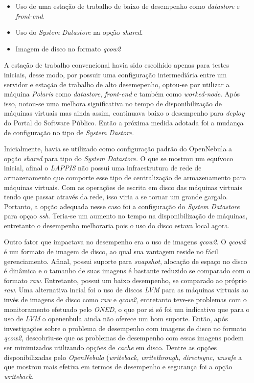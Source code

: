 \begin{itemize}
\item Uso de uma estação de trabalho de baixo de desempenho como \textit{datastore} e \textit{front-end}.
\item Uso do \textit{System Datastore} na opção \textit{shared}.
\item Imagem de disco no formato \textit{qcow2}
\end{itemize}

A estação de trabalho convencional havia sido escolhido apenas para testes iniciais, desse modo, por possuir uma configuração intermediária entre um servidor e estação de trabalho de alto desemepenho, optou-se por utilizar a máquina \textit{Polaris} como \textit{datastore}, \textit{front-end} e também como \textit{worked-node}. Após isso, notou-se uma melhora significativa no tempo de disponibilização de máquinas virtuais mas ainda assim, continuava baixo o desempenho para \textit{deploy} do Portal do Software Público. Então a próxima medida adotada foi a mudança de configuração no tipo de \textit{System Dastore}. 

Inicialmente, havia se utilizado como configuração padrão do OpenNebula a opção \textit{shared} para tipo do \textit{System Datastore}. O que se mostrou um equívoco inicial, afinal o \textit{LAPPIS} não possui uma infraestrutura de rede de armazenamento que comporte esse tipo de centralização de armazenamento para máquinas virtuais. Com as operações de escrita em disco das máquinas virtuais tendo que passar através da rede, isso viria a se tornar um grande gargalo. Portanto, a opção adequada nesse caso foi a configuração do \textit{System Datastore} para opçao \textit{ssh}. Teria-se um aumento no tempo na disponibilização de máquinas, entretanto o desempenho melhoraria pois o uso do disco estava local agora. 

Outro fator que impactava no desempenho era o uso de imagens \textit{qcow2}. O \textit{qcow2} é um formato de imagem de disco, ao qual sua vantagem reside no fácil gerenciamento. Afinal, possui suporte para \textit{snapshot}, alocação de espaço no disco é dinâmica e o tamanho de suas imagens é bastante reduzido se comparado com o formato \textit{raw}. Entretanto, possui um baixo desempenho, se comparado ao  próprio \textit{raw}. Uma alternativa incial foi o uso de discos \textit{LVM} para as máquinas virtuais ao invés de imagens de disco como \textit{raw} e \textit{qcow2}, entretanto teve-se problemas com o monitoramento efetuado pelo \textit{ONED}, o que por si só foi um indicativo que para o uso de \textit{LVM} o openenbula ainda não oferece um bom suporte. Então, após investigações sobre o problema de desempenho com imagens de disco no formato \textit{qcow2}, descobriu-se que os problemas de desempenho com essas imagens podem ser minimizados utilizando opções de \textit{cache} em disco. Dentre as opções disponibilizadas pelo \textit{OpenNebula} (\textit{writeback, writethrough, directsync, unsafe} a que mostrou mais efetiva em termos de desempenho e segurança foi a opção \textit{writeback}.

